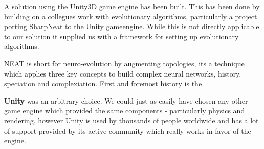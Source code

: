 A solution using the Unity3D\cite{web:unity} game engine has been built. This has been done by building on a collegues work with evolutionary algorithms, particularly a project porting SharpNeat\cite{web:unityneat} to the Unity gameengine\cite{web:sharpneat}. While this is not directly applicable to our solution it supplied us with a framework for setting up evolutionary algorithms.

NEAT is short for neuro-evolution by augmenting topologies, its a technique which applies three key concepts to build complex neural networks, history, speciation and complexiation. First and foremost history is the 
    
\textbf{Unity} was an arbitrary choice. We could just as easily have chosen any other game engine which provided the same components - particularly physics and rendering, however Unity is used by thousands of people worldwide and has a lot of support provided by its active community which really works in favor of the engine.

